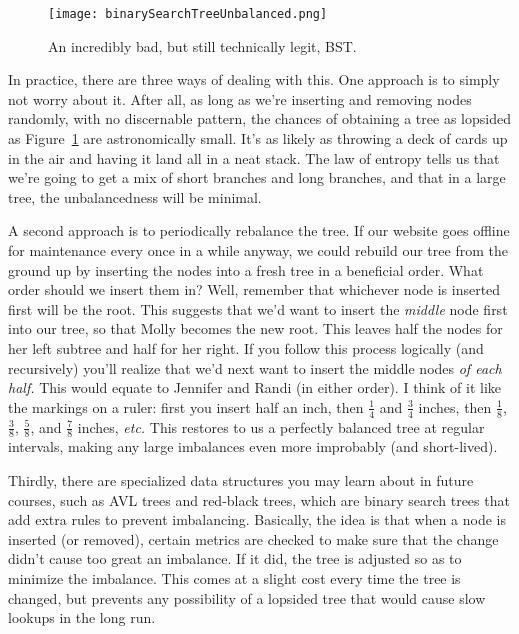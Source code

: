 \begin{figure}[ht]
\centering
\texttt{[image: binarySearchTreeUnbalanced.png]}
\caption{An incredibly bad, but still technically legit, BST.}
\label{bstunbalanced}
\end{figure}

In practice, there are three ways of dealing with this. One approach is to
simply not worry about it. After all, as long as we're inserting and
removing nodes randomly, with no discernable pattern, the chances of
obtaining a tree as lopsided as Figure~\ref{bstunbalanced} are
astronomically small. It's as likely as throwing a deck of cards up in the
air and having it land all in a neat stack. The law of entropy tells us
that we're going to get a mix of short branches and long branches, and that
in a large tree, the unbalancedness will be minimal.

A second approach is to periodically rebalance the tree. If our website
goes offline for maintenance every once in a while anyway, we could rebuild
our tree from the ground up by inserting the nodes into a fresh tree in a
beneficial order. What order should we insert them in? Well, remember that
whichever node is inserted first will be the root. This suggests that we'd
want to insert the \textit{middle} node first into our tree, so that Molly
becomes the new root. This leaves half the nodes for her left subtree and
half for her right. If you follow this process logically (and recursively)
you'll realize that we'd next want to insert the middle nodes \textit{of
each half.} This would equate to Jennifer and Randi (in either order). I
think of it like the markings on a ruler: first you insert half an inch,
then $\frac{1}{4}$ and $\frac{3}{4}$ inches, then $\frac{1}{8}$,
$\frac{3}{8}$, $\frac{5}{8}$, and $\frac{7}{8}$ inches, \textit{etc.} This
restores to us a perfectly balanced tree at regular intervals, making any
large imbalances even more improbably (and short-lived).

Thirdly, there are specialized data structures you may learn about in
future courses, such as AVL trees and red-black trees, which are binary
search trees that add extra rules to prevent imbalancing. Basically, the
idea is that when a node is inserted (or removed), certain metrics are
checked to make sure that the change didn't cause too great an imbalance.
If it did, the tree is adjusted so as to minimize the imbalance. This comes
at a slight cost every time the tree is changed, but prevents any
possibility of a lopsided tree that would cause slow lookups in the long
run.

